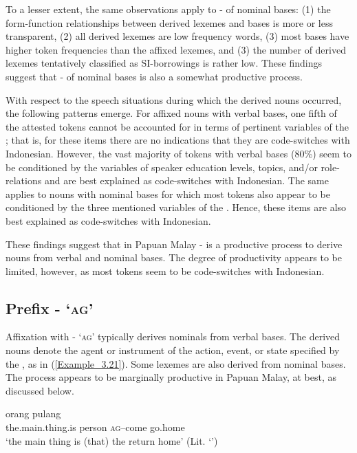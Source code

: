 To a lesser extent, the same observations apply to - of nominal bases: (1) the form-function relationships between derived lexemes and bases is more or less transparent, (2) all derived lexemes are low frequency words, (3) most bases have higher token frequencies than the affixed lexemes, and (3) the number of derived lexemes tentatively classified as SI-borrowings is rather low. These findings suggest that - of nominal bases is also a somewhat productive process.



With respect to the speech situations during which the derived nouns occurred, the following patterns emerge. For affixed nouns with verbal bases, one fifth of the attested tokens cannot be accounted for in terms of pertinent variables of the ; that is, for these items there are no indications that they are code-switches with Indonesian. However, the vast majority of tokens with verbal bases (80\%) seem to be conditioned by the variables of speaker education levels, topics, and/or role-relations and are best explained as code-switches with Indonesian. The same applies to nouns with nominal bases for which most tokens also appear to be conditioned by the three mentioned variables of the . Hence, these items are also best explained as code-switches with Indonesian.



These findings suggest that in Papuan Malay - is a productive process to derive nouns from verbal and nominal bases. The degree of productivity appears to be limited, however, as most tokens seem to be code-switches with Indonesian.


\subsection[Prefix {\PEN}- ‘\textsc{ag}’]{Prefix - ‘\textsc{ag}’}\label{Para_3.1.4}

Affixation with - ‘\textsc{ag}’ typically derives nominals from verbal bases. The derived nouns denote the agent or instrument of the action, event, or state specified by the , as in (\ref{Example_3.21}). Some lexemes are also derived from nominal bases. The  process appears to be marginally productive in Papuan Malay, at best, as discussed below.


\ea
\label{Example_3.21}
 {orang} {} {pulang}\\ %
 the.main.thing.is  person  \textsc{ag}–come  go.home\\
\glt 
‘the main thing is (that) the  return home’ (Lit. ‘’) \textstyleExampleSource{[081029-005-Cv.0048]}
\z


